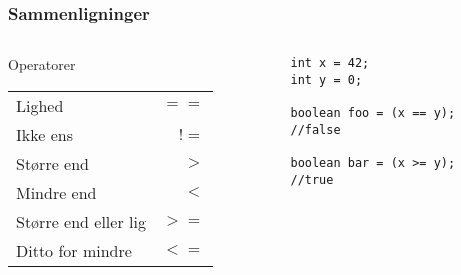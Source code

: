 \documentclass{beamer}
\begin{document}
\begin{frame}[fragile]
  \frametitle{Sammenligninger}
  \begin{columns}
    \begin{column}{0.5\textwidth}
      \begin{block}{Operatorer}
        \begin{table}[h]
          \centering
          \begin{tabular}{lr}
            \hline
            Lighed & $==$ \\
            Ikke ens & $!=$\\
            Større end & $> $\\
            Mindre end & $<$\\
            Større end eller lig & $>=$\\
            Ditto for mindre & $<=$\\
            
          \end{tabular}
        \end{table}
      \end{block}
    \end{column}
    \begin{column}{0.5\textwidth}
\begin{verbatim} 
int x = 42;
int y = 0;

boolean foo = (x == y);
//false

boolean bar = (x >= y);
//true

\end{verbatim}
    \end{column}
  \end{columns}
\end{frame}
\end{document}
